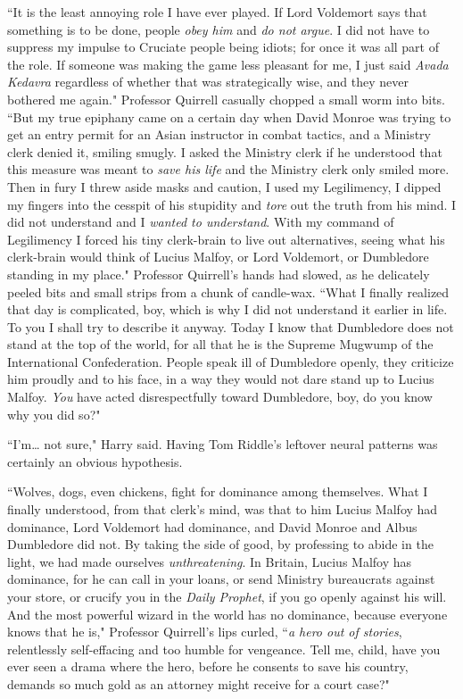 ``It is the least annoying role I have ever played. If Lord Voldemort says that something is to be done, people \emph{obey him} and \emph{do not argue}. I did not have to suppress my impulse to Cruciate people being idiots; for once it was all part of the role. If someone was making the game less pleasant for me, I just said \emph{Avada Kedavra} regardless of whether that was strategically wise, and they never bothered me again." Professor Quirrell casually chopped a small worm into bits. ``But my true epiphany came on a certain day when David Monroe was trying to get an entry permit for an Asian instructor in combat tactics, and a Ministry clerk denied it, smiling smugly. I asked the Ministry clerk if he understood that this measure was meant to \emph{save his life} and the Ministry clerk only smiled more. Then in fury I threw aside masks and caution, I used my Legilimency, I dipped my fingers into the cesspit of his stupidity and \emph{tore} out the truth from his mind. I did not understand and I \emph{wanted to understand}. With my command of Legilimency I forced his tiny clerk-brain to live out alternatives, seeing what his clerk-brain would think of Lucius Malfoy, or Lord Voldemort, or Dumbledore standing in my place." Professor Quirrell's hands had slowed, as he delicately peeled bits and small strips from a chunk of candle-wax. ``What I finally realized that day is complicated, boy, which is why I did not understand it earlier in life. To you I shall try to describe it anyway. Today I know that Dumbledore does not stand at the top of the world, for all that he is the Supreme Mugwump of the International Confederation. People speak ill of Dumbledore openly, they criticize him proudly and to his face, in a way they would not dare stand up to Lucius Malfoy. \emph{You} have acted disrespectfully toward Dumbledore, boy, do you know why you did so?"

``I'm{\ldots} not sure," Harry said. Having Tom Riddle's leftover neural patterns was certainly an obvious hypothesis.

``Wolves, dogs, even chickens, fight for dominance among themselves. What I finally understood, from that clerk's mind, was that to him Lucius Malfoy had dominance, Lord Voldemort had dominance, and David Monroe and Albus Dumbledore did not. By taking the side of good, by professing to abide in the light, we had made ourselves \emph{unthreatening}. In Britain, Lucius Malfoy has dominance, for he can call in your loans, or send Ministry bureaucrats against your store, or crucify you in the \emph{Daily Prophet}, if you go openly against his will. And the most powerful wizard in the world has no dominance, because everyone knows that he is," Professor Quirrell's lips curled, ``\emph{a hero out of stories}, relentlessly self-effacing and too humble for vengeance. Tell me, child, have you ever seen a drama where the hero, before he consents to save his country, demands so much gold as an attorney might receive for a court case?"

